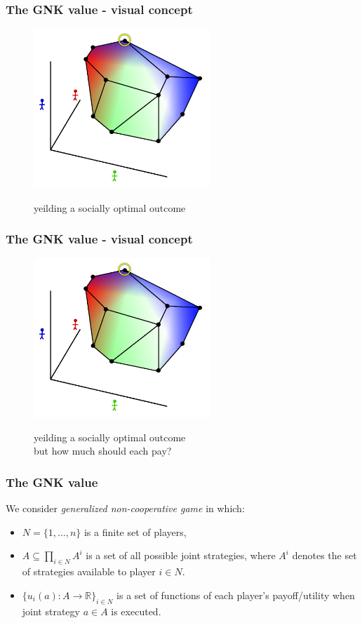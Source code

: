 \begin{frame} \frametitle{The GNK value - visual concept} \begin{figure} \begin{center} \includegraphics[height=6cm]{figs/pp9} \end{center} yeilding a socially optimal outcome \end{figure} \end{frame}
\begin{frame} \frametitle{The GNK value - visual concept} \begin{figure} \begin{center} \includegraphics[height=6cm]{figs/pp9} \end{center} yeilding a socially optimal outcome \\ but how much should each pay? \end{figure} \end{frame}



\begin{frame}
\frametitle{The GNK value}
We consider \textit{generalized non-cooperative game} in which:
\begin{itemize}
\item	$N=\{1,\dots,n\}$ is a finite set of players,
\item	$A\subseteq \prod_{i\in N}A^i$ is a set of all possible joint strategies, where $A^i$ denotes the set of strategies available to player $i\in N$.
\item	$\{u_i(a) : A\rightarrow \mathbb{R}\}_{i\in N}$ is a set of functions of each player's payoff/utility when joint strategy $a\in A$ is executed.
\end{itemize}
\end{frame}


